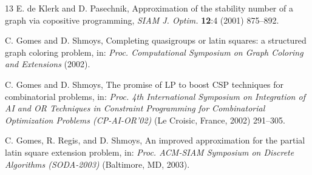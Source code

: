 \documentclass[11pt]{article}
\begin{document}
\begin{thebibliography}{13}
  E. de Klerk and D. Pasechnik,
  Approximation of the stability number of a graph via copositive programming,
  {\em SIAM J. Optim.\/} {\bf 12}:4 (2001) 875--892.

  C. Gomes and D. Shmoys,
  Completing quasigroups or latin squares: a structured graph coloring problem,
  in: {\em Proc. Computational Symposium on Graph Coloring and Extensions\/}
  (2002).

  C. Gomes and D. Shmoys,
  The promise of LP to boost CSP techniques for combinatorial problems,
  in: {\em Proc. 4th International Symposium on Integration of AI and OR
  Techniques in Constraint Programming for Combinatorial Optimization Problems
  (CP-AI-OR'02)\/} (Le Croisic, France, 2002) 291--305.

  C. Gomes, R. Regis, and D. Shmoys,
  An improved approximation for the partial latin square extension problem,
  in: {\em Proc. ACM-SIAM Symposium on Discrete Algorithms (SODA-2003)\/}
  (Baltimore, MD, 2003).

\end{thebibliography}
\end{document}
